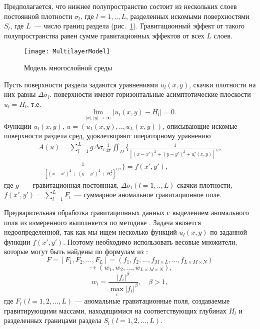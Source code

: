 Предполагается, что нижнее полупространство состоит из нескольких слоев постоянной плотности $\sigma_l$, где $l=1,..,L$, разделенных искомыми поверхностями $S_l$, где $L$~--- число границ раздела (рис.~\ref{fig:multlayer}). Гравитационный эффект от такого полупространства равен сумме гравитационных эффектов от всех $L$ слоев.
\begin{figure}[h]
	\centering
	\texttt{[image: MultilayerModel]}
	\caption{Модель многослойной среды}
	\label{fig:multlayer}
\end{figure}
Пусть поверхности раздела задаются уравнениями $u_l(x,y)$, скачки плотности на них равны $\Delta\sigma_l$. поверхности имеют горизонтальные асимптотические плоскости $u_l=H_l$, т.е. $$\lim_{|x|,|y|\to\infty}|u_l(x,y)-H_l|=0.$$ Функции $u_l(x,y)$, $u=(u_1(x,y), .., u_L(x,y))$, описывающие искомые поверхности раздела сред, удовлетворяют операторному уравнению
\begin{equation}\label{equ_grav}
\begin{aligned}
A(u)=\sum_{l=1}^{L}g\Delta\sigma_l\frac{1}{4\pi}\iint_D\bigg\{\frac{1}{[(x-x')^2+(y-y')^2+u_l^2(x,y)]^{1/2}} \\
-\frac{1}{[(x-x')^2+(y-y')^2+H_l^2]^{1/2}}\bigg\}=f(x',y'),
\end{aligned}
\end{equation}
где $g$~---~гравитационная постоянная, $\Delta\sigma_l(l=1,..,L)$ скачки плотности, $f(x',y')=\sum_{l=1}^{L}F_l$~--- суммарное аномальное гравитационное поле. 

Предварительная обработка гравитационных данных с выделением аномального поля из измеренного выполняется по методике  \cite{MarPrut2003}. Задача является недоопределенной, так как мы ищем несколько функций $u_l(x,y)$ по заданной функции $f(x',y')$. Поэтому необходимо использовать весовые множители, которые могут быть найдены по формулам из \cite{AkMarMis2013}:
$$F=[F_1, F_2, ..., F_L]=(f_1, f_2, ..., f_{M\times L}, ..., f_{L\times M\times N})$$
$$\to (w_1, w_2, ..., w_{L\times M\times N}),$$
\begin{equation}\label{weght_fact_formula}
w_i=\frac{|f_i|^\beta}{\max\limits_{i} |f_i|^\beta}, \quad \beta>1,
\end{equation}
где $F_l (l=1, 2, ..., L)$ --- аномальные гравитационные поля, создаваемые гравитирующими массами, находящимися на соответствующих глубинах $H_l$ и разделенных границами раздела $S_l(l=1, 2, ..., L)$.

